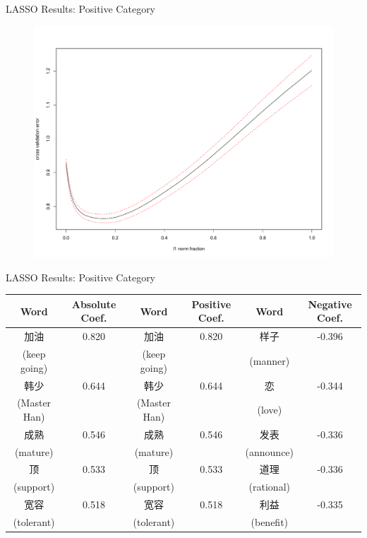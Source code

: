 \documentclass[12pt, trans]{beamer}
\newcommand{\1}[1]{{\mathbf 1}\left\{#1\right\}}        %
\begin{document}
\begin{frame}{LASSO Results: Positive Category}

\begin{figure}
  \centering
  \includegraphics[height=0.9\textheight]{./../../lassoResults/CVPosErr.pdf} 
\end{figure}

\end{frame}

\begin{frame}{LASSO Results: Positive Category}
\tiny
\begin{center}
\begin{tabular}{|c|c||c|c||c|c|}
\hline
Word & Absolute Coef. & Word & Positive Coef. & Word & Negative Coef.\\ \hline \hline
加油 & 0.820 & 加油 & 0.820 & 样子 & -0.396\\
(keep going) & & (keep going) & & (manner) & \\\hline
韩少 & 0.644 & 韩少 & 0.644 & 恋 & -0.344\\
(Master Han) & & (Master Han) & & (love) & \\\hline
成熟 & 0.546 & 成熟 & 0.546 & 发表 & -0.336\\
(mature) & & (mature) & & (announce) & \\\hline
顶 & 0.533 & 顶 & 0.533 & 道理 & -0.336\\
(support) & & (support) & & (rational) & \\\hline
宽容 & 0.518 & 宽容 & 0.518 & 利益 & -0.335\\
(tolerant) & & (tolerant) & & (benefit) & \\\hline
\end{tabular}
\end{center}


\end{frame}
\end{document}
